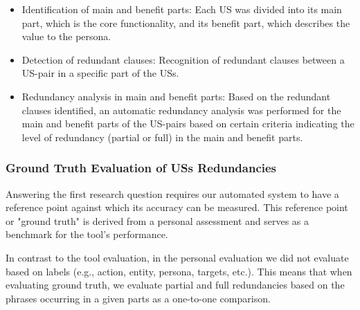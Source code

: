 \begin{itemize}
	
	\item Identification of main and benefit parts: Each US was divided into its main part, which is the core functionality, and its benefit part, which describes the value to the persona.
	
	\item Detection of redundant clauses: Recognition of redundant clauses between a US-pair in a specific part of the USs.
	
	\item Redundancy analysis in main and benefit parts: Based on the redundant clauses identified, an automatic redundancy analysis was performed for the main and benefit parts of the US-pairs based on certain criteria indicating the level of redundancy (partial or full) in the main and benefit parts.
		
\end{itemize}
\subsubsection*{Ground Truth Evaluation of USs Redundancies}
Answering the first research question requires our automated system to have a reference point against which its accuracy can be measured. This reference point or "ground truth" is derived from a personal assessment and serves as a benchmark for the tool's performance.

In contrast to the tool evaluation, in the personal evaluation we did not evaluate based on labels (e.g., action, entity, persona, targets, etc.). This means that when evaluating ground truth, we evaluate partial and full redundancies based on the phrases occurring in a given parts as a one-to-one comparison.

